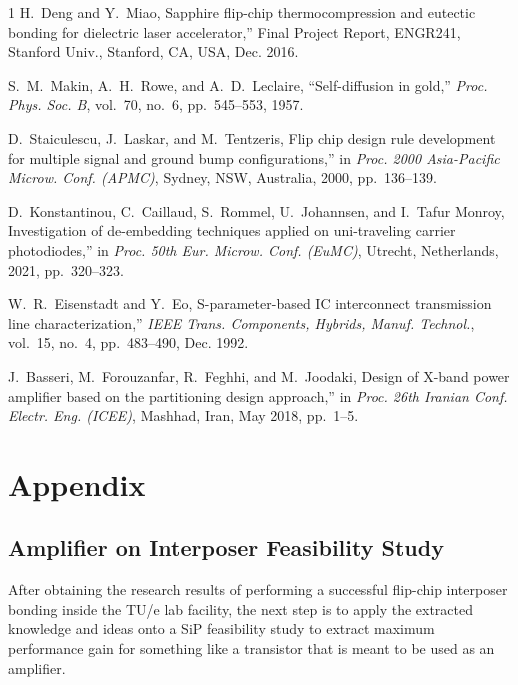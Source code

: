 \documentclass[conference]{IEEEtran}
\begin{document}
\begin{thebibliography}{1}
H.~Deng and Y.~Miao,  
Sapphire flip-chip thermocompression and eutectic bonding for dielectric laser accelerator,''  
Final Project Report, ENGR241, Stanford Univ., Stanford, CA, USA, Dec. 2016.

S.~M.~Makin, A.~H.~Rowe, and A.~D.~Leclaire,  
``Self-diffusion in gold,''  
\emph{Proc. Phys. Soc. B}, vol.~70, no.~6, pp.~545--553, 1957.


D.~Staiculescu, J.~Laskar, and M.~Tentzeris,  
Flip chip design rule development for multiple signal and ground bump configurations,''  
in \emph{Proc. 2000 Asia-Pacific Microw. Conf. (APMC)}, Sydney, NSW, Australia, 2000, pp.~136--139.

D.~Konstantinou, C.~Caillaud, S.~Rommel, U.~Johannsen, and I.~Tafur Monroy,  
Investigation of de-embedding techniques applied on uni-traveling carrier photodiodes,''  
in \emph{Proc. 50th Eur. Microw. Conf. (EuMC)}, Utrecht, Netherlands, 2021, pp.~320--323.

W.~R.~Eisenstadt and Y.~Eo,  
S-parameter-based IC interconnect transmission line characterization,''  
\emph{IEEE Trans. Components, Hybrids, Manuf. Technol.}, vol.~15, no.~4, pp.~483--490, Dec. 1992.

J.~Basseri, M.~Forouzanfar, R.~Feghhi, and M.~Joodaki,  
Design of X-band power amplifier based on the partitioning design approach,''  
in \emph{Proc. 26th Iranian Conf. Electr. Eng. (ICEE)}, Mashhad, Iran, May 2018, pp.~1--5.

\end{thebibliography}

\clearpage
\newpage

\section*{Appendix}\label{sec:appendix}

\subsection{Amplifier on Interposer Feasibility Study}\label{subsec:amp_feas}

After obtaining the research results of performing a successful flip-chip interposer bonding inside the TU/e lab facility, the next step is to apply the extracted knowledge and ideas onto a SiP feasibility study to extract maximum performance gain for something like a transistor that is meant to be used as an amplifier.
\end{document}
